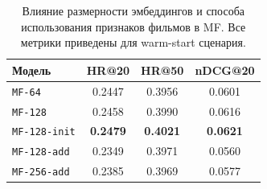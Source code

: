 \begin{table}[htbp]
	\centering
	\footnotesize
	\setlength{\tabcolsep}{4pt}
	\caption{Влияние размерности эмбеддингов и способа использования признаков фильмов в MF. Все метрики приведены для warm-start сценария.}
	\label{tab:features_mf}
	\begin{tabular}{@{}lccc@{}}
		\toprule
		Модель & HR@20 & HR@50 & nDCG@20 \\
		\midrule
		\texttt{MF-64}      & 0.2447 & 0.3956 & 0.0601 \\
		\texttt{MF-128}     & 0.2458 & 0.3990 & 0.0616 \\
		\texttt{MF-128-init}& \textbf{0.2479} & \textbf{0.4021} & \textbf{0.0621} \\
		\texttt{MF-128-add} & 0.2349 & 0.3971 & 0.0560 \\
		\texttt{MF-256-add} & 0.2385 & 0.3969 & 0.0577 \\
		\bottomrule
	\end{tabular}
\end{table}